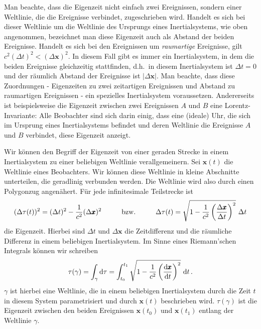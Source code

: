 Man beachte, dass die Eigenzeit nicht einfach zwei Ereignissen, sondern einer Weltlinie, die
die Ereignisse verbindet, zugeschrieben wird. Handelt es sich bei dieser Weltlinie um die
Weltlinie des Ursprungs 
eines Inertialsystems, wie oben angenommen, bezeichnet man diese Eigenzeit auch als Abstand der
beiden Ereignisse. Handelt es sich bei den Ereignissen um 
\textit{raumartige} Ereignisse,
gilt $c^2 (\Delta t)^2 < (\Delta \pmb{x})^2$. In diesem Fall gibt es immer ein Inertialsystem, in dem
die beiden Ereignisse gleichzeitig stattfinden, d.h.\ in diesem Inertialsystem ist $\Delta t=0$ und
der r\"aumlich Abstand der Ereignisse ist $|\Delta \pmb{x}|$. Man beachte, dass diese
Zuordnungen - Eigenzeiten zu zwei zeitartigen Ereignissen und Abstand zu raumartigen
Ereignissen - ein spezielles Inertialsystem voraussetzen. Andererseits ist beispielsweise die
Eigenzeit zwischen zwei Ereignissen $A$ und $B$ eine Lorentz-Invariante: 
Alle Beobachter sind sich darin einig, dass eine (ideale) Uhr, die sich im Ursprung eines 
Inertialsystems befindet und deren Weltlinie die Ereignisse $A$ und $B$ verbindet, 
diese Eigenzeit anzeigt.   

Wir k\"onnen den Begriff der Eigenzeit von einer geraden Strecke in einem Inertialsystem
zu einer beliebigen Weltlinie verallgemeinern. Sei $\pmb{x}(t)$ die Weltlinie eines Beobachters. 
Wir k\"onnen diese Weltlinie in kleine Abschnitte unterteilen, die geradlinig verbunden werden.
Die Weltlinie wird also durch einen Polygonzug angen\"ahert. F\"ur jede infinitesimale
Teilstrecke ist
\begin{equation}
\label{eq_Eigenzeit0}
           (\Delta \tau (t))^2 =  (\Delta t)^2 - \frac{1}{c^2}(\Delta \pmb{x})^2 
           \hspace{1cm} {\rm bzw.} \hspace{1cm}
       \Delta \tau (t) =  \sqrt{ 1  -\frac{1}{c^2} \left( \frac{\Delta \pmb{x}}{\Delta t} \right)^2} ~ \Delta t
\end{equation}
die Eigenzeit. Hierbei sind $\Delta t$ und $\Delta \pmb{x}$ die Zeitdifferenz und
die r\"aumliche Differenz in einem beliebigen Inertialsystem. Im Sinne eines Riemann'schen
Integrals k\"onnen wir schreiben
\begin{equation}
\label{eq_Eigenzeit}
              \tau(\gamma) = \int_\gamma {\rm d}\tau = \int_{t_0}^{t_1} 
               \sqrt{ 1  -\frac{1}{c^2} \left( \frac{{\rm d} \pmb{x}}{{\rm d} t} \right)^2} ~ {\rm d} t \, .
\end{equation}
$\gamma$ ist hierbei eine Weltlinie, 
die in einem beliebigen Inertialsystem durch
die Zeit $t$ in diesem System parametrisiert und durch $\pmb{x}(t)$ beschrieben wird.
$\tau(\gamma)$ ist die Eigenzeit zwischen den beiden Ereignissen $\pmb{x}(t_0)$ und
$\pmb{x}(t_1)$ entlang der Weltlinie $\gamma$.  

